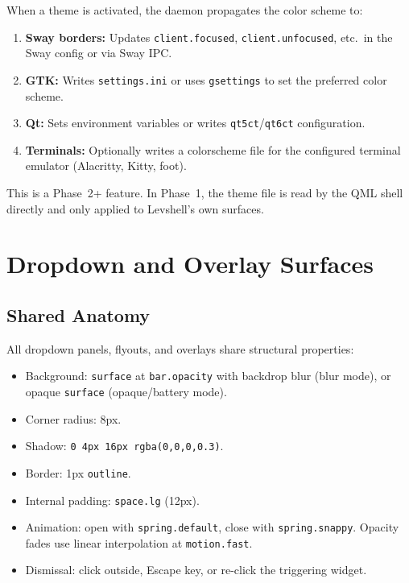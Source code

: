 \documentclass[11pt,a4paper]{article}
\begin{document}
When a theme is activated, the daemon propagates the color scheme to:

\begin{enumerate}[leftmargin=1.5em, itemsep=2pt]
  \item \textbf{Sway borders:} Updates \texttt{client.focused}, \texttt{client.unfocused}, etc.\ in the Sway config or via Sway IPC.
  \item \textbf{GTK:} Writes \texttt{settings.ini} or uses \texttt{gsettings} to set the preferred color scheme.
  \item \textbf{Qt:} Sets environment variables or writes \texttt{qt5ct}/\texttt{qt6ct} configuration.
  \item \textbf{Terminals:} Optionally writes a colorscheme file for the configured terminal emulator (Alacritty, Kitty, foot).
\end{enumerate}

This is a Phase~2+ feature. In Phase~1, the theme file is read by the QML shell directly and only applied to Levshell's own surfaces.


\section{Dropdown and Overlay Surfaces}
\label{sec:overlays}

\subsection{Shared Anatomy}

All dropdown panels, flyouts, and overlays share structural properties:

\begin{itemize}[leftmargin=1.5em, itemsep=2pt]
  \item Background: \texttt{surface} at \texttt{bar.opacity} with backdrop blur (blur mode), or opaque \texttt{surface} (opaque/battery mode).
  \item Corner radius: 8px.
  \item Shadow: \texttt{0 4px 16px rgba(0,0,0,0.3)}.
  \item Border: 1px \texttt{outline}.
  \item Internal padding: \texttt{space.lg} (12px).
  \item Animation: open with \texttt{spring.default}, close with \texttt{spring.snappy}. Opacity fades use linear interpolation at \texttt{motion.fast}.
  \item Dismissal: click outside, Escape key, or re-click the triggering widget.
\end{itemize}
\end{document}
